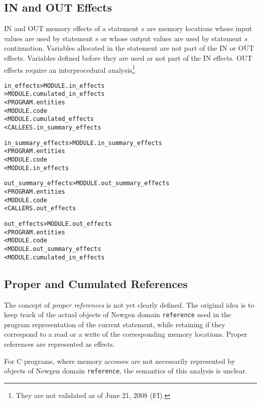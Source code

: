 \documentclass[a4paper]{report}
\newenvironment{PipsMake}{\begin{alltt}}{\end{alltt}}
\begin{document}
\subsection{IN and OUT Effects}
\label{subsubsection-in-and-out-effects}

IN and OUT memory effects of a statement $s$ are memory locations
whose input values are used by statement $s$ or whose output values
are used by statement $s$ continuation. Variables allocated in the
statement are not part of the IN or OUT effects. Variables defined
before they are used ar not part of the IN effects. OUT effects
require an interprocedural analysis\footnote{They are not validated as
of June 21, 2008 (FI).}

\begin{PipsMake}
in_effects > MODULE.in_effects
           > MODULE.cumulated_in_effects
         < PROGRAM.entities
         < MODULE.code
         < MODULE.cumulated_effects
         < CALLEES.in_summary_effects

in_summary_effects > MODULE.in_summary_effects
        < PROGRAM.entities
        < MODULE.code
        < MODULE.in_effects

out_summary_effects > MODULE.out_summary_effects
        < PROGRAM.entities
        < MODULE.code
        < CALLERS.out_effects

out_effects > MODULE.out_effects
        < PROGRAM.entities
        < MODULE.code
        < MODULE.out_summary_effects
        < MODULE.cumulated_in_effects
\end{PipsMake}

\subsection{Proper and Cumulated References}

The concept of {\em proper references} is not yet clearly defined. The
original idea is to keep track of the actual objects of Newgen domain
{\tt reference} used in the program representation of the current
statement, while retaining if they correspond to a read or a write of
the corresponding memory locations. Proper references are
represented as effects.

For C programs, where memory accesses are not necessarily represented
by objects of Newgen domain {\tt reference}, the semantics of this
analysis is unclear.
\end{document}
